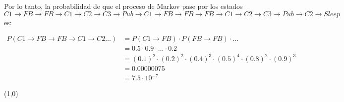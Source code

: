 Por lo tanto, la probabilidad de que el proceso de Markov pase por los estados $C1 \rightarrow FB \rightarrow FB \rightarrow C1 \rightarrow C2 \rightarrow C3 \rightarrow Pub \rightarrow C1 \rightarrow FB \rightarrow FB \rightarrow FB \rightarrow C1 \rightarrow C2 \rightarrow C3 \rightarrow Pub \rightarrow C2 \rightarrow Sleep$ es:

\begin{align*}
    P(C1 \rightarrow FB \rightarrow FB \rightarrow C1 \rightarrow C2 \ldots) & = P(C1 \rightarrow FB) \cdot P(FB \rightarrow FB) \cdot \ldots \\
    &= 0.5 \cdot 0.9 \cdot \ldots \cdot 0.2 \\
    &= (0.1)^2 \cdot (0.2)^2 \cdot (0.4)^3 \cdot (0.5)^4 \cdot (0.8)^2 \cdot (0.9)^3 \\
    &= 0.00000075\\
    &= 7.5 \cdot 10^{-7}
\end{align*}

\line(1,0){\textwidth}
